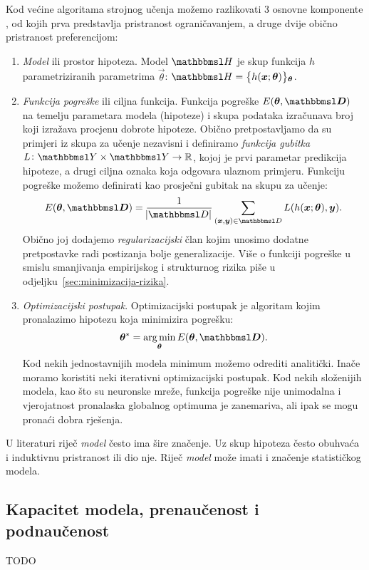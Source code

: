 \documentclass[utf8, diplomski, lmodern]{fer}
\begin{document}
Kod većine algoritama strojnog učenja možemo razlikovati 3 osnovne komponente \citep{Snajder:2014:SU}, od kojih prva predstavlja pristranost ograničavanjem, a druge dvije obično pristranost preferencijom:
\begin{enumerate}
	\item \emph{Model} ili prostor hipoteza. Model $\set H$ je skup funkcija $h$  parametriziranih parametrima $\vec\theta$: $\set H=\cbr{h(\vec x;\vec{\theta})}_{\vec{\theta}}$.
	\item \emph{Funkcija pogreške} ili ciljna funkcija. Funkcija pogreške $E(\vec{\theta,\set D})$ na temelju parametara modela (hipoteze) i skupa podataka izračunava broj koji izražava procjenu dobrote hipoteze. Obično pretpostavljamo da su primjeri iz skupa za učenje nezavisni i definiramo \emph{funkcija gubitka} $\funcdef{L}{\set Y\times\set Y}{\R}$, kojoj je prvi parametar predikcija hipoteze, a drugi ciljna oznaka koja odgovara ulaznom primjeru. Funkciju pogreške možemo definirati kao prosječni gubitak na skupu za učenje:
	\begin{align}
	E(\vec{\theta,\set D})=\frac{1}{\envert{\set D}}\sum_{(\vec x,\vec y)\in\set D} L(h(\vec x;\vec{\theta}),\vec y) \text{.}
	\end{align}
	Obično joj dodajemo \emph{regularizacijski} član kojim unosimo dodatne pretpostavke radi postizanja bolje generalizacije. Više o funkciji pogreške u smislu smanjivanja empirijskog i strukturnog rizika piše u odjeljku~\ref{sec:minimizacija-rizika}.
	\item \emph{Optimizacijski postupak}. Optimizacijski postupak je algoritam kojim pronalazimo hipotezu koja minimizira pogrešku:
	\begin{align}
	\vec\theta^* = \argmin_{\vec{\theta}} E(\vec{\theta,\set D}) \text{.}
	\end{align}
	Kod nekih jednostavnijih modela minimum možemo odrediti analitički. Inače moramo koristiti neki iterativni optimizacijski postupak. Kod nekih složenijih modela, kao što su neuronske mreže, funkcija pogreške nije unimodalna i vjerojatnost pronalaska globalnog optimuma je zanemariva, ali ipak se mogu pronaći dobra rješenja.
\end{enumerate}

U literaturi riječ \textit{model} često ima šire značenje. Uz skup hipoteza često obuhvaća i induktivnu pristranost ili dio nje. Riječ \textit{model} može imati i značenje statističkog modela.

\subsection{Kapacitet modela, prenaučenost i podnaučenost}
TODO
\end{document}
